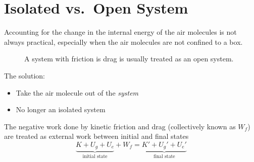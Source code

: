 \section{Isolated vs.\ Open System}
Accounting for the change in the internal energy of the air molecules is not
always practical, especially when the air molecules are not confined to a box.
\begin{figure}[ht]
  \centering
  \caption{A system with friction is drag is usually treated as an open
    system.}
  \label{fig:open-system}
\end{figure}

The solution:
\begin{itemize}
\item Take the air molecule out of the \emph{system}
\item No longer an isolated system
\end{itemize}
The negative work done by kinetic friction and drag (collectively known as
$W_f$) are treated as external work between initial and final states
\begin{equation}
  \underbrace{K + U_g + U_e}_\text{initial state} + W_f=
  \underbrace{K' + U_g' + U_e'}_\text{final state}
\end{equation}

%
%  
%    


